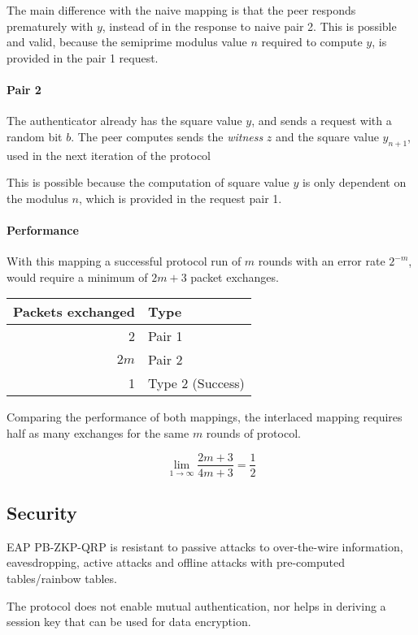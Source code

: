 The main difference with the naive mapping is that the peer responds prematurely with $y$, instead of in the response to naive pair 2. %
This is possible and valid, because the semiprime modulus value $n$ required to compute $y$, is provided in the pair 1 request.

\paragraph{Pair 2}
The authenticator already has the square value $y$, and sends a request with a random bit $b$. 
The peer computes sends the \textit{witness} $z$ and the square value $y_{n+1}$, used in the next iteration of the protocol

This is possible because the computation of square value $y$ is only dependent on the modulus $n$, which is provided in the request pair 1.

\paragraph{Performance}
With this mapping a successful protocol run of $m$ rounds with an error rate $2^{-m}$, would require a minimum of $2m + 3$ packet exchanges.

\begin{center}
\begin{tabular}{r|l}
	Packets exchanged & Type\\
	\hline
	2 & Pair 1\\
	$2m$ & Pair 2\\
	1 & Type 2 (Success)\\
\end{tabular}
\end{center}

Comparing the performance of both mappings, the interlaced mapping requires half as many exchanges for the same $m$ rounds of protocol.

$$\lim_{1 \rightarrow \infty} \frac{2m + 3}{4m + 3} = \frac{1}{2}$$

\bigskip
\subsection{Security}
EAP PB-ZKP-QRP is resistant to passive attacks to over-the-wire information, eavesdropping, active attacks and offline attacks with pre-computed tables/rainbow tables.

The protocol does not enable mutual authentication, nor helps in deriving a session key that can be used for data encryption.
